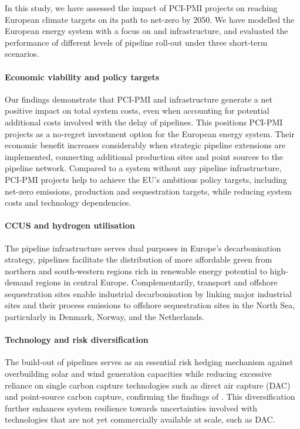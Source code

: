 \documentclass[preprint,12pt,sort&compress]{elsarticle}
\begin{document}
In this study, we have assessed the impact of PCI-PMI projects on reaching European climate targets on its path to net-zero by 2050. We have modelled the European energy system with a focus on  and  infrastructure, and evaluated the performance of different levels of pipeline roll-out under three short-term scenarios. 


\paragraph{Economic viability and policy targets}
Our findings demonstrate that PCI-PMI  and  infrastructure generate a net positive impact on total system costs, even when accounting for potential additional costs involved with the delay of pipelines. This positions PCI-PMI projects as a no-regret investment option for the European energy system. 
Their economic benefit increases considerably when strategic pipeline extensions are implemented, connecting additional  production sites and  point sources to the pipeline network. 
Compared to a system without any pipeline infrastructure, PCI-PMI projects help to achieve the EU's ambitious policy targets, including net-zero emissions,  production and  sequestration targets, while reducing system costs and technology dependencies.

\paragraph{CCUS and hydrogen utilisation}
The pipeline infrastructure serves dual purposes in Europe's decarbonisation strategy,  pipelines facilitate the distribution of more affordable green  from northern and south-western regions rich in renewable energy potential to high-demand regions in central Europe. Complementarily,  transport and offshore sequestration sites enable industrial decarbonisation by linking major industrial sites and their process emissions to offshore sequestration sites in the North Sea, particularly in Denmark, Norway, and the Netherlands.

\paragraph{Technology and risk diversification}
The build-out of pipelines serves as an essential risk hedging mechanism against overbuilding solar and wind generation capacities while reducing excessive reliance on single carbon capture technologies such as direct air capture (DAC) and point-source carbon capture, confirming the findings of \cite{hofmannH2CO2Network2025}. This diversification further enhances system resilience towards uncertainties involved with technologies that are not yet commercially available at scale, such as DAC.
\end{document}
